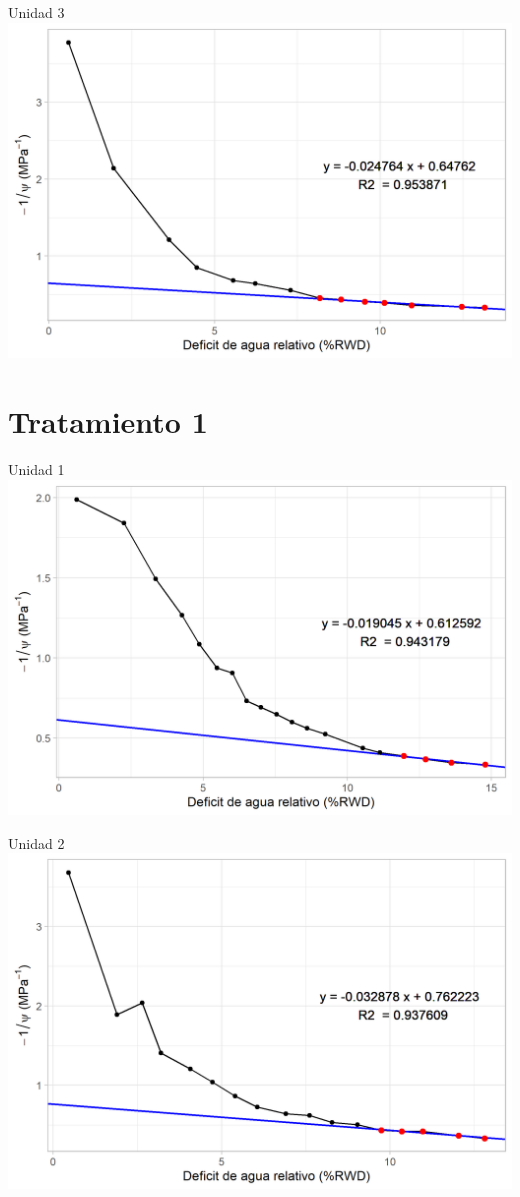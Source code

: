 \documentclass[
  letterpaper,
  DIV=11,
  numbers=noendperiod]{scrreprt}
\begin{document}
Unidad 3 \includegraphics{figuras/06_tlp/tlp_rio_claro_T0_3.png}

\chapter{Tratamiento 1}

Unidad 1 \includegraphics{figuras/06_tlp/tlp_rio_claro_T1_1.png}

Unidad 2 \includegraphics{figuras/06_tlp/tlp_rio_claro_T1_2.png}
\end{document}

